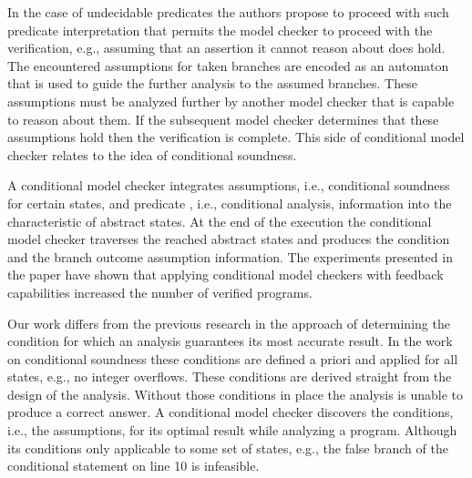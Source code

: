 In the case of undecidable predicates the authors propose to proceed with such predicate interpretation that permits the model checker to proceed with the verification, e.g., assuming that an assertion it cannot reason about does hold. The encountered assumptions for taken branches are encoded as an automaton that is used to guide the further analysis to the assumed branches. These assumptions must be analyzed further by another model checker that is capable to reason about them. If the subsequent model checker determines that these assumptions hold then the verification is complete. This side of conditional model checker relates to the idea of conditional soundness.


A conditional model checker integrates assumptions, i.e., conditional soundness for certain states, and predicate , i.e., conditional analysis, information into the characteristic of abstract states. At the end of the execution  the conditional model checker traverses the reached abstract states and produces the condition and the branch outcome assumption information. The experiments presented in the paper have shown that applying conditional model checkers with feedback capabilities increased the number of verified programs.



Our work differs from the previous research in the approach of determining the condition for which an analysis guarantees its most accurate result. In the work on conditional soundness these conditions are defined a priori and applied for all states, e.g., no integer overflows. These conditions are derived straight from the design of the analysis. Without those conditions in place the analysis is unable to produce a correct answer. A conditional model checker discovers the conditions, i.e., the assumptions, for its optimal result while analyzing a program. Although its conditions only applicable to some set of states, e.g., the false branch of the conditional statement on line 10 is infeasible. 

